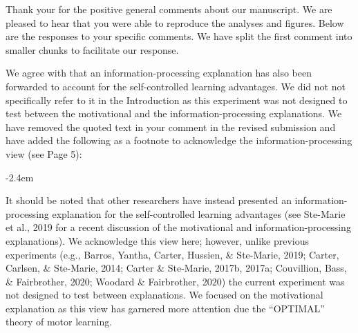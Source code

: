 \documentclass[final]{article}
\renewenvironment{quote}{\begin{fquote}\advance\leftmargini -2.4em\begin{oldquote}}{\end{oldquote}\end{fquote}}
\newenvironment{fquote}
  {\def\FrameCommand{
	\fboxsep=0.6em %
	\fcolorbox{black}{white}}%
    \MakeFramed {\advance\hsize-2\width \FrameRestore}
    \begin{minipage}{\linewidth}
  }
  {\end{minipage}\endMakeFramed}
\begin{document}
Thank your for the positive general comments about our manuscript. We are pleased to hear that you were able to reproduce the analyses and figures. Below are the responses to your specific comments. We have split the first comment into smaller chunks to facilitate our response.


We agree with that an information-processing explanation has also been forwarded to account for the self-controlled learning advantages. We did not not specifically refer to it in the Introduction as this experiment was not designed to test between the motivational and the information-processing explanations. We have removed the quoted text in your comment in the revised submission and have added the following as a footnote to acknowledge the information-processing view (see Page 5):

\begin{quote}
It should be noted that other researchers have instead presented an information-processing explanation for the self-controlled learning advantages (see Ste-Marie et al., 2019 for a recent discussion of the motivational and information-processing explanations). We acknowledge this view here; however, unlike previous experiments (e.g., Barros, Yantha, Carter, Hussien, \& Ste-Marie, 2019; Carter, Carlsen, \& Ste-Marie, 2014; Carter \& Ste-Marie, 2017b, 2017a; Couvillion, Bass, \& Fairbrother, 2020; Woodard \& Fairbrother, 2020) the current experiment was not designed to test between explanations. We focused on the motivational explanation as this view has garnered more attention due the ``OPTIMAL'' theory of motor learning.
\end{quote}
\end{document}
